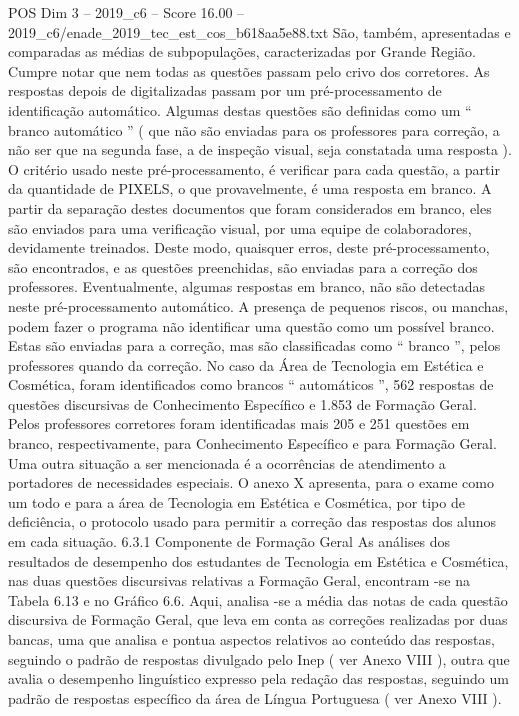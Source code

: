 \begin{textsample}{POS Dim 3 – 2019\_c6 – Score 16.00 – 2019\_c6/enade\_2019\_tec\_est\_cos\_b618aa5e88.txt}
São, também, apresentadas e comparadas as médias de subpopulações, caracterizadas por Grande Região.
Cumpre notar que nem todas as questões passam pelo crivo dos corretores.
As respostas depois de digitalizadas passam por um pré-processamento de identificação automático.
Algumas destas questões são definidas como um “ branco automático ” ( que não são enviadas para os professores para correção, a não ser que na segunda fase, a de inspeção visual, seja constatada uma resposta ).
O critério usado neste pré-processamento, é verificar para cada questão, a partir da quantidade de PIXELS, o que provavelmente, é uma resposta em branco.
A partir da separação destes documentos que foram considerados em branco, eles são enviados para uma verificação visual, por uma equipe de colaboradores, devidamente treinados.
Deste modo, quaisquer erros, deste pré-processamento, são encontrados, e as questões preenchidas, são enviadas para a correção dos professores.
Eventualmente, algumas respostas em branco, não são detectadas neste pré-processamento automático.
A presença de pequenos riscos, ou manchas, podem fazer o programa não identificar uma questão como um possível branco.
Estas são enviadas para a correção, mas são classificadas como “ branco ”, pelos professores quando da correção.
No caso da Área de Tecnologia em Estética e Cosmética, foram identificados como brancos “ automáticos ”, 562 respostas de questões discursivas de Conhecimento Específico e 1.853 de Formação Geral.
Pelos professores corretores foram identificadas mais 205 e 251 questões em branco, respectivamente, para Conhecimento Específico e para Formação Geral.
Uma outra situação a ser mencionada é a ocorrências de atendimento a portadores de necessidades especiais.
O anexo X apresenta, para o exame como um todo e para a área de Tecnologia em Estética e Cosmética, por tipo de deficiência, o protocolo usado para permitir a correção das respostas dos alunos em cada situação. 6.3.1 Componente de Formação Geral As análises dos resultados de desempenho dos estudantes de Tecnologia em Estética e Cosmética, nas duas questões discursivas relativas a Formação Geral, encontram -se na Tabela 6.13 e no Gráfico 6.6.
Aqui, analisa -se a média das notas de cada questão discursiva de Formação Geral, que leva em conta as correções realizadas por duas bancas, uma que analisa e pontua aspectos relativos ao conteúdo das respostas, seguindo o padrão de respostas divulgado pelo Inep ( ver Anexo VIII ), outra que avalia o desempenho linguístico expresso pela redação das respostas, seguindo um padrão de respostas específico da área de Língua Portuguesa ( ver Anexo VIII ).

\end{textsample}

